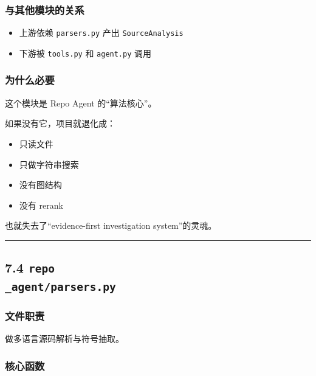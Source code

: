 \documentclass[UTF8,12pt,openany]{ctexbook}
\begin{document}
\subsubsection{与其他模块的关系}

\begin{itemize}
\item 上游依赖 \texttt{parsers.py} 产出 \texttt{SourceAnalysis}
\item 下游被 \texttt{tools.py} 和 \texttt{agent.py} 调用
\end{itemize}

\subsubsection{为什么必要}

这个模块是 Repo Agent 的“算法核心”。  \par
如果没有它，项目就退化成：\par

\begin{itemize}
\item 只读文件
\item 只做字符串搜索
\item 没有图结构
\item 没有 rerank
\end{itemize}

也就失去了“evidence-first investigation system”的灵魂。\par

\hrule

\subsection{7.4 \texttt{repo\\_agent/parsers.py}}

\subsubsection{文件职责}

做多语言源码解析与符号抽取。\par

\subsubsection{核心函数}
\end{document}
